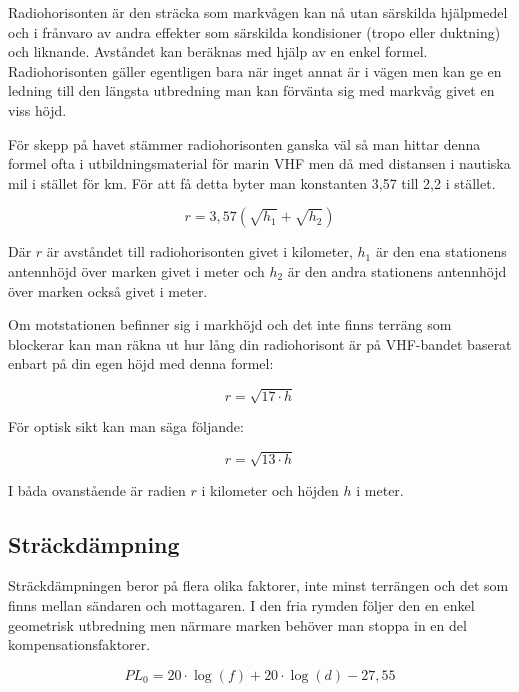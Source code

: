 Radiohorisonten är den sträcka som markvågen kan nå utan särskilda hjälpmedel
och i frånvaro av andra effekter som särskilda kondisioner (tropo eller
duktning) och liknande. Avståndet kan beräknas med hjälp av en enkel formel.
Radiohorisonten gäller egentligen bara när inget annat är i vägen men kan ge
en ledning till den längsta utbredning man kan förvänta sig med markvåg givet
en viss höjd.

För skepp på havet stämmer radiohorisonten ganska väl så man hittar denna
formel ofta i utbildningsmaterial för marin VHF men då med distansen i
nautiska mil i stället för km. För att få detta byter man konstanten 3,57 till
2,2 i stället.

\begin{equation}
	r = 3,57 \left(\sqrt{h_1}+\sqrt{h_2}\right)
\end{equation}

Där $r$ är avståndet till radiohorisonten givet i kilometer, $h_1$ är den ena
stationens antennhöjd över marken givet i meter och $h_2$ är den andra
stationens antennhöjd över marken också givet i meter.

Om motstationen befinner sig i markhöjd och det inte finns terräng som
blockerar kan man räkna ut hur lång din radiohorisont är på VHF-bandet baserat
enbart på din egen höjd med denna formel:

\begin{equation}
	r = \sqrt{17 \cdot h}
\end{equation}

För optisk sikt kan man säga följande:

\begin{equation}
	r = \sqrt{13 \cdot h}
\end{equation}

I båda ovanstående är radien $r$ i kilometer och höjden $h$ i meter.

\subsection{Sträckdämpning}

Sträckdämpningen beror på flera olika faktorer, inte minst terrängen och det
som finns mellan sändaren och mottagaren. I den fria rymden följer den en
enkel geometrisk utbredning men närmare marken behöver man stoppa in en del
kompensationsfaktorer.

\begin{equation}
	PL_0 = 20 \cdot \log(f) + 20 \cdot \log(d) - 27,55
\end{equation}

